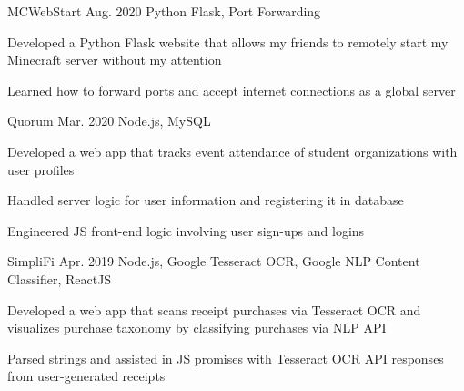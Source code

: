 
\begin{cvprojects}

  \cvproject
  {MCWebStart} %
  {\href{https://github.com/KevinIsMyName/MCWebStart}{\faGithubSquare\acvHeaderIconSep\@KevinIsMyName}} %
  {Aug. 2020} %
  {Python Flask, Port Forwarding} %
  {
    \begin{cvitems}
      \item {Developed a Python Flask website that allows my friends to remotely start my Minecraft server without my attention}
      \item {Learned how to forward ports and accept internet connections as a global server}
    \end{cvitems}
  }

  \cvproject
  {Quorum}
  {\href{https://github.com/KevinIsMyName/Quorum}{\faGithubSquare\acvHeaderIconSep\@KevinIsMyName}}
  {Mar. 2020}
  {Node.js, MySQL}
  {
    \begin{cvitems}
      \item {Developed a web app that tracks event attendance of student organizations with user profiles}
      \item {Handled server logic for user information and registering it in database}
      \item {Engineered JS front-end logic involving user sign-ups and logins}
    \end{cvitems}
  }

  \cvproject
  {SimpliFi}
  {\href{https://github.com/unitehenry/simply-finance}{\faGithubSquare\acvHeaderIconSep{}}}
  {Apr. 2019}
  {Node.js, Google Tesseract OCR, Google NLP Content Classifier, ReactJS}
  {
    \begin{cvitems}
      \item {Developed a web app that scans receipt purchases via Tesseract OCR and visualizes purchase taxonomy by classifying purchases via NLP API}
      \item {Parsed strings and assisted in JS promises with Tesseract OCR API responses from user-generated receipts}
    \end{cvitems}
  }


\end{cvprojects}
